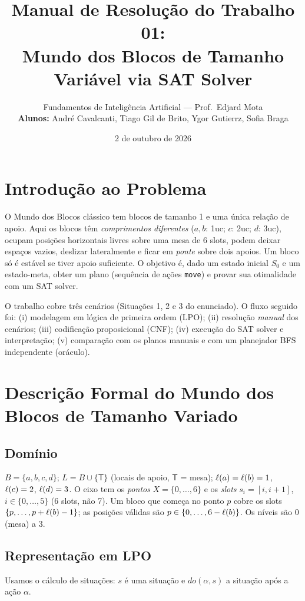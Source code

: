 \documentclass[11pt,a4paper]{article}
\title{Manual de Resolução do Trabalho 01:\\ Mundo dos Blocos de Tamanho Variável via SAT Solver}
\author{Fundamentos de Inteligência Artificial --- Prof.\ Edjard Mota\\[6pt]
\textbf{Alunos:} André Cavalcanti, Tiago Gil de Brito, Ygor Gutierrz, Sofia Braga}
\date{2 de outubro de 2026}
\newcommand{\Tm}{\mathsf{T}}
\begin{document}
\maketitle
\tableofcontents

\section{Introdução ao Problema}
O Mundo dos Blocos clássico tem blocos de tamanho 1 e uma única relação de apoio. Aqui os
blocos têm \emph{comprimentos diferentes} ($a,b$: 1uc; $c$: 2uc; $d$: 3uc), ocupam
posições horizontais livres sobre uma mesa de 6 slots, podem deixar espaços vazios, deslizar
lateralmente e ficar em \emph{ponte} sobre dois apoios. Um bloco só é estável se tiver
apoio suficiente. O objetivo é, dado um estado inicial $S_0$ e um estado-meta, obter um plano
(sequência de ações \texttt{move}) e provar sua otimalidade com um SAT solver.

O trabalho cobre três cenários (Situações 1, 2 e 3 do enunciado). O fluxo seguido foi:
(i) modelagem em lógica de primeira ordem (LPO); (ii) resolução \emph{manual} dos cenários;
(iii) codificação proposicional (CNF); (iv) execução do SAT solver e interpretação; (v) comparação
com os planos manuais e com um planejador BFS independente (oráculo).

\section{Descrição Formal do Mundo dos Blocos de Tamanho Variado}
\subsection{Domínio}
$B=\{a,b,c,d\}$; $L=B\cup\{\Tm\}$ (locais de apoio, $\Tm$ = mesa); $\ell(a)=\ell(b)=1$,
$\ell(c)=2$, $\ell(d)=3$. O eixo tem os \emph{pontos} $X=\{0,\dots,6\}$ e os \emph{slots}
$s_i=[i,i+1]$, $i\in\{0,\dots,5\}$ (6 slots, não 7). Um bloco que começa no ponto $p$ cobre os slots
$\{p,\dots,p+\ell(b)-1\}$; as posições válidas são $p\in\{0,\dots,6-\ell(b)\}$. Os níveis são
$0$ (mesa) a $3$.

\subsection{Representação em LPO}
Usamos o cálculo de situações: $s$ é uma situação e $do(\alpha,s)$ a situação após a ação $\alpha$.
\end{document}
